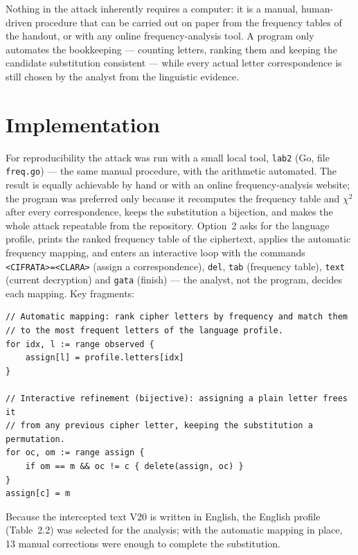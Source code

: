 \documentclass[12pt,a4paper]{article}
\begin{document}
Nothing in the attack inherently requires a computer: it is a manual, human-driven procedure that can be carried out on paper from the frequency tables of the handout, or with any online frequency-analysis tool. A program only automates the bookkeeping --- counting letters, ranking them and keeping the candidate substitution consistent --- while every actual letter correspondence is still chosen by the analyst from the linguistic evidence.

\section{Implementation}

For reproducibility the attack was run with a small local tool, \texttt{lab2} (Go, file \texttt{freq.go}) --- the same manual procedure, with the arithmetic automated. The result is equally achievable by hand or with an online frequency-analysis website; the program was preferred only because it recomputes the frequency table and $\chi^2$ after every correspondence, keeps the substitution a bijection, and makes the whole attack repeatable from the repository. Option~2 asks for the language profile, prints the ranked frequency table of the ciphertext, applies the automatic frequency mapping, and enters an interactive loop with the commands \texttt{<CIFRATA>=<CLARA>} (assign a correspondence), \texttt{del}, \texttt{tab} (frequency table), \texttt{text} (current decryption) and \texttt{gata} (finish) --- the analyst, not the program, decides each mapping. Key fragments:

\begin{lstlisting}[style=go,caption={Key fragments of the automatic mapping and interactive refinement (\texttt{freq.go})}]
// Automatic mapping: rank cipher letters by frequency and match them
// to the most frequent letters of the language profile.
for idx, l := range observed {
    assign[l] = profile.letters[idx]
}

// Interactive refinement (bijective): assigning a plain letter frees it
// from any previous cipher letter, keeping the substitution a permutation.
for oc, om := range assign {
    if om == m && oc != c { delete(assign, oc) }
}
assign[c] = m
\end{lstlisting}

Because the intercepted text V20 is written in English, the English profile (Table~2.2) was selected for the analysis; with the automatic mapping in place, 13 manual corrections were enough to complete the substitution.
\end{document}
